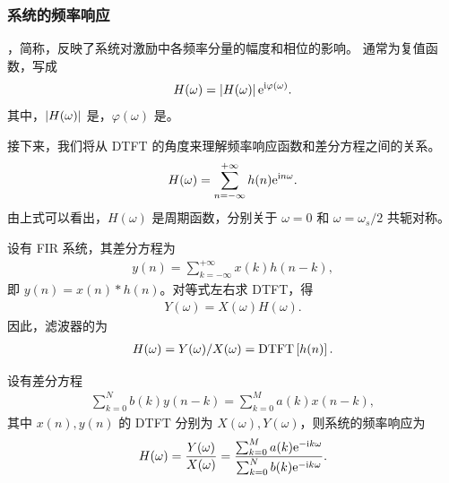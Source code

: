 \subsubsection{系统的频率响应}

\begin{definition}[系统的频率响应]
    ，简称，反映了系统对激励中各频率分量的幅度和相位的影响。
    通常为复值函数，写成
    \begin{align*}
        H(\omega) = \left|H(\omega)\right|\mathrm{e}^{\mathrm{i} \varphi(\omega)}.
    \end{align*}
    其中，$\left|H(\omega)\right|$ 是，$\varphi(\omega)$ 是。
    
    接下来，我们将从 DTFT 的角度来理解频率响应函数和差分方程之间的关系。
    \begin{align*}
        H(\omega) = \sum_{n = -\infty}^{+\infty}h(n)\mathrm{e}^{\mathrm{i} n \omega}.
    \end{align*}
    由上式可以看出，$H(\omega)$ 是周期函数，分别关于 $\omega = 0$ 和 $\omega = \omega_s/2$ 共轭对称。
\end{definition}

\begin{example}
    设有 FIR 系统，其差分方程为
    \begin{align*}
        y(n) = \sum_{k = -\infty}^{+\infty}x(k)h(n - k),
    \end{align*}
    即 $y(n) = x(n) * h(n)$。对等式左右求 DTFT，得
    \begin{align*}
        Y(\omega) = X(\omega) H(\omega).
    \end{align*}
    因此，滤波器的为
    \begin{align*}
        H(\omega) = Y(\omega) / X(\omega) = \mathrm{DTFT}\left[h(n)\right].
    \end{align*}
\end{example}

\begin{theorem}[频率响应与差分方程]
    \label{thm:freq-response-diff-equation}
    设有差分方程
    \begin{align*}
        \sum_{k = 0}^{N}b(k)y(n - k) = \sum_{k = 0}^{M}a(k)x(n - k),
    \end{align*}
    其中 $x(n), y(n)$ 的 DTFT 分别为 $X(\omega), Y(\omega)$，则系统的频率响应为
    \begin{align*}
        H(\omega) = \frac{Y(\omega)}{X(\omega)} = \frac{\sum_{k = 0}^{M}a(k)\mathrm{e}^{-\mathrm{i} k \omega}}{\sum_{k = 0}^{N}b(k)\mathrm{e}^{-\mathrm{i} k \omega}}.
    \end{align*}
\end{theorem}

